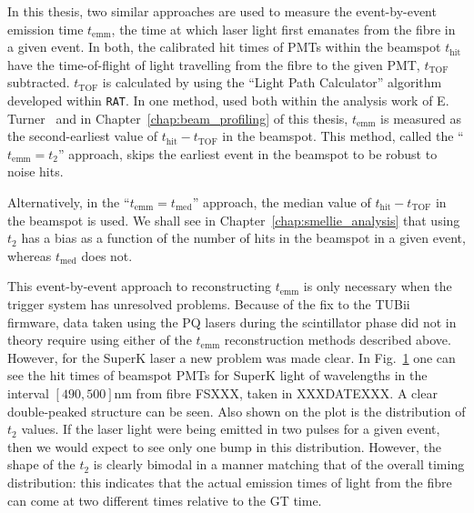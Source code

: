 In this thesis, two similar approaches are used to measure the event-by-event emission time $t_{\mathrm{emm}}$, the time at which laser light first emanates from the fibre in a given event. In both, the calibrated hit times of PMTs within the beamspot $t_{\mathrm{hit}}$ have the time-of-flight of light travelling from the fibre to the given PMT, $t_{\mathrm{TOF}}$ subtracted. $t_{\mathrm{TOF}}$ is calculated by using the ``Light Path Calculator'' algorithm developed within \texttt{RAT}. In one method, used both within the analysis work of E. Turner~\cite{turnerMeasurementScatteringCharacteristics2022} %
and in Chapter~\ref{chap:beam_profiling} of this thesis, $t_{\mathrm{emm}}$ is measured as the second-earliest value of $t_{\mathrm{hit}}-t_{\mathrm{TOF}}$ in the beamspot. This method, called the ``$t_{\mathrm{emm}} = t_{2}$'' approach, skips the earliest event in the beamspot to be robust to noise hits.

Alternatively, in the ``$t_{\mathrm{emm}} = t_{\mathrm{med}}$'' approach, the median value of $t_{\mathrm{hit}}-t_{\mathrm{TOF}}$ in the beamspot is used. We shall see in Chapter~\ref{chap:smellie_analysis} that using $t_{2}$ has a bias as a function of the number of hits in the beamspot in a given event, whereas $t_{\mathrm{med}}$ does not.

This event-by-event approach to reconstructing $t_{\mathrm{emm}}$ is only necessary when the trigger system has unresolved problems. Because of the fix to the TUBii firmware, data taken using the PQ lasers during the scintillator phase did not in theory require using either of the $t_{\mathrm{emm}}$ reconstruction methods described above. However, for the SuperK laser a new problem was made clear. In Fig.~\ref{fig:smellie_superk_double_peaks} one can see the hit times of beamspot PMTs for SuperK light of wavelengths in the interval $[490,500]\si{\nm}$ from fibre FSXXX, taken in XXXDATEXXX. %
A clear double-peaked structure can be seen. Also shown on the plot is the distribution of $t_{2}$ values. If the laser light were being emitted in two pulses for a given event, then we would expect to see only one bump in this distribution. However, the shape of the $t_{2}$ is clearly bimodal in a manner matching that of the overall timing distribution: this indicates that the actual emission times of light from the fibre can come at two different times relative to the GT time.

\begin{figure}
    \centering
    \caption[]{}
    \label{fig:smellie_superk_double_peaks}
\end{figure}

